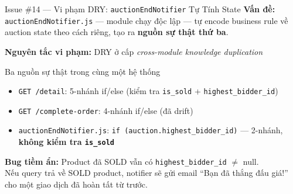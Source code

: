 \documentclass[12pt]{beamer}
\begin{document}
\begin{frame}{Issue \#14 — Vi phạm DRY: \texttt{auctionEndNotifier} Tự Tính State}
  \textbf{Vấn đề:} \texttt{auctionEndNotifier.js} — module chạy độc lập — tự encode business rule về auction state theo cách riêng, tạo ra \textbf{nguồn sự thật thứ ba}.

  \bigskip
  \textbf{Nguyên tắc vi phạm:} \alert{DRY} ở cấp \emph{cross-module knowledge duplication}

  \bigskip
  \begin{block}{Ba nguồn sự thật trong cùng một hệ thống}
    \begin{itemize}
      \item \texttt{GET /detail}: 5-nhánh if/else (kiểm tra \texttt{is\_sold} + \texttt{highest\_bidder\_id})
      \item \texttt{GET /complete-order}: 4-nhánh if/else (đã drift)
      \item \texttt{auctionEndNotifier.js}: \texttt{if (auction.highest\_bidder\_id)} — 2-nhánh, \textbf{không kiểm tra \texttt{is\_sold}}
    \end{itemize}
  \end{block}

  \bigskip
  \textbf{Bug tiềm ẩn:} Product đã SOLD vẫn có \texttt{highest\_bidder\_id} $\neq$ null.\\
  Nếu query trả về SOLD product, notifier sẽ gửi email ``Bạn đã thắng đấu giá!'' cho một giao dịch đã hoàn tất từ trước.
\end{frame}
\end{document}
